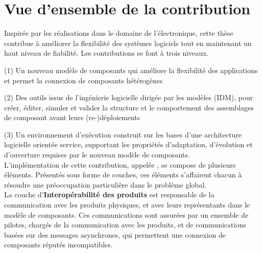 \section{Vue d'ensemble de la contribution}

Inspirée par les réalisations dans le domaine de l'électronique, cette thèse contribue à améliorer la flexibilité des systèmes logiciels tout en maintenant un haut niveau de fiabilité. Les contributions se font à trois niveaux.

\par (1) Un nouveau modèle de composants qui améliore la flexibilité des applications et permet la connexion de composants hétérogènes
\par (2) Des outils issus de l'ingénierie logicielle dirigée par les modèles (IDM), pour créer, éditer, simuler et valider la structure et le comportement des assemblages de composant avant leurs (re-)déploiements
\par (3) Un environnement d'exécution construit sur les bases d'une architecture logicielle orientée service, supportant les propriétés d'adaptation, d'évolution et d'ouverture requises par le nouveau modèle de composants.\\

L'implémentation de cette contribution, appelée \enti{}, se compose de plusieurs éléments. Présentés sous forme de couches, ces éléments s'affairent chacun à résoudre une préoccupation particulière dans le problème global.\\

La couche d'{\bf Interopérabilité des produits} est responsable de la communication avec les produits physiques, et avec leurs représentants dans le modèle de composants. Ces communications sont assurées par un ensemble de pilotes, chargés de la communication avec les produits, et de communications basées sur des messages asynchrones, qui permettent une connexion de composants réputés incompatibles.\\

